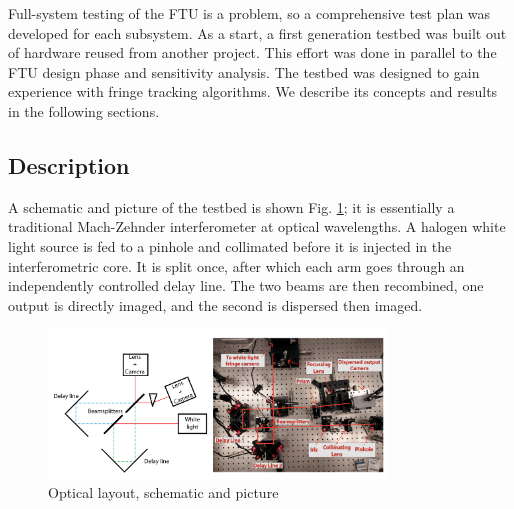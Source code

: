 Full-system testing of the FTU is a problem, so a comprehensive test plan was developed for each subsystem. As a start, a first generation testbed was built out of hardware reused from another project. This effort was done in parallel to the FTU design phase and sensitivity analysis. The testbed was designed to gain experience with fringe tracking algorithms. We describe its concepts and results in the following sections.


\subsection{Description}
A schematic and picture of the testbed is shown Fig. \ref{fig:layout}; it is essentially a traditional Mach-Zehnder interferometer at optical wavelengths. A halogen white light source is fed to a pinhole and collimated before it is injected in the interferometric core. It is split once, after which each arm goes through an independently controlled delay line. The two beams are then recombined, one output is directly imaged, and the second is dispersed then imaged. 

\begin{figure}[ht!]
\begin{center}
\includegraphics[width=0.8\textwidth]{Figures/layout.png}
\caption{Optical layout, schematic and picture}
\label{fig:layout}
\end{center}
\end{figure}

